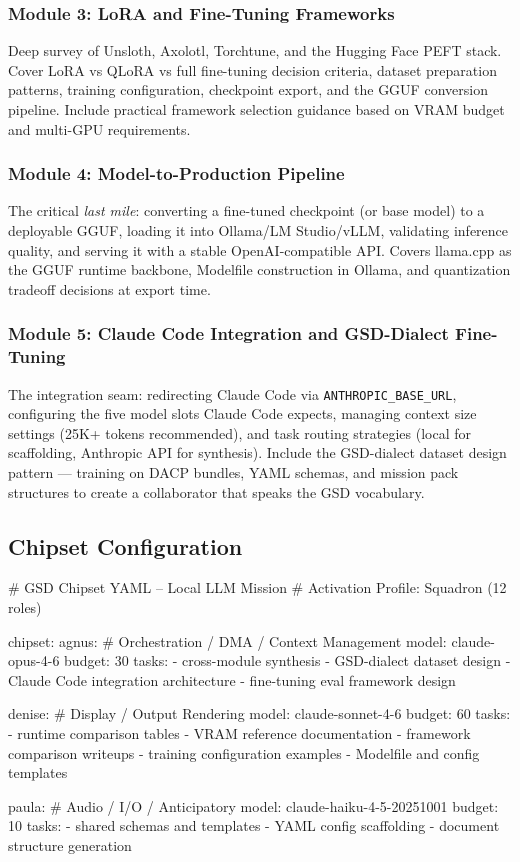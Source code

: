 \documentclass[11pt,letterpaper]{article}
\begin{document}
\subsubsection{Module 3: LoRA and Fine-Tuning Frameworks}
Deep survey of Unsloth, Axolotl, Torchtune, and the Hugging Face PEFT stack. Cover LoRA vs QLoRA vs full fine-tuning decision criteria, dataset preparation patterns, training configuration, checkpoint export, and the GGUF conversion pipeline. Include practical framework selection guidance based on VRAM budget and multi-GPU requirements.

\subsubsection{Module 4: Model-to-Production Pipeline}
The critical \emph{last mile}: converting a fine-tuned checkpoint (or base model) to a deployable GGUF, loading it into Ollama/LM Studio/vLLM, validating inference quality, and serving it with a stable OpenAI-compatible API. Covers llama.cpp as the GGUF runtime backbone, Modelfile construction in Ollama, and quantization tradeoff decisions at export time.

\subsubsection{Module 5: Claude Code Integration and GSD-Dialect Fine-Tuning}
The integration seam: redirecting Claude Code via \texttt{ANTHROPIC\_BASE\_URL}, configuring the five model slots Claude Code expects, managing context size settings (25K+ tokens recommended), and task routing strategies (local for scaffolding, Anthropic API for synthesis). Include the GSD-dialect dataset design pattern --- training on DACP bundles, YAML schemas, and mission pack structures to create a collaborator that speaks the GSD vocabulary.

\subsection{Chipset Configuration}

\begin{asciibox}
# GSD Chipset YAML -- Local LLM Mission
# Activation Profile: Squadron (12 roles)

chipset:
  agnus:          # Orchestration / DMA / Context Management
    model: claude-opus-4-6
    budget: 30%
    tasks:
      - cross-module synthesis
      - GSD-dialect dataset design
      - Claude Code integration architecture
      - fine-tuning eval framework design

  denise:         # Display / Output Rendering
    model: claude-sonnet-4-6
    budget: 60%
    tasks:
      - runtime comparison tables
      - VRAM reference documentation
      - framework comparison writeups
      - training configuration examples
      - Modelfile and config templates

  paula:          # Audio / I/O / Anticipatory
    model: claude-haiku-4-5-20251001
    budget: 10%
    tasks:
      - shared schemas and templates
      - YAML config scaffolding
      - document structure generation
\end{asciibox}
\end{document}
